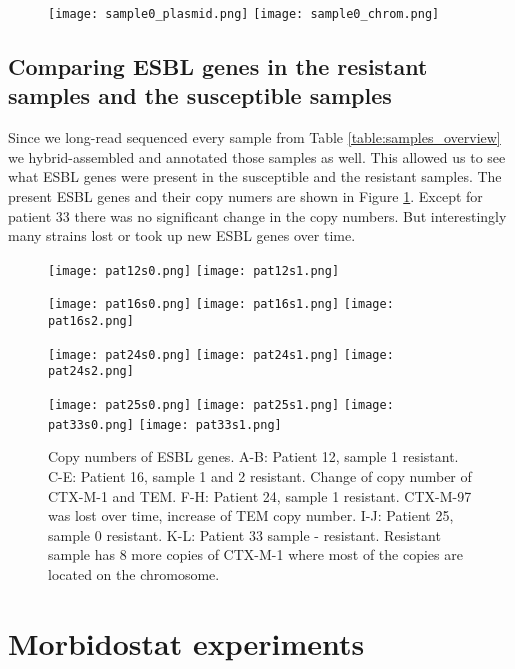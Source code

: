 \begin{figure}
	\texttt{[image: sample0\_plasmid.png]}
	\texttt{[image: sample0\_chrom.png]}
	\caption{}
\end{figure}
	
\subsection{Comparing ESBL genes in the resistant samples and the susceptible samples}
Since we long-read sequenced every sample from Table \ref{table:samples_overview} we hybrid-assembled and annotated those samples as well. This allowed us to see what ESBL genes were present in the susceptible and the resistant samples. The present ESBL genes and their copy numers are shown in Figure \ref{figure:esbl_genes}. Except for patient 33 there was no significant change in the copy numbers. But interestingly many strains lost or took up new ESBL genes over time. 
\begin{figure}[H]
	\texttt{[image: pat12s0.png]}
	\texttt{[image: pat12s1.png]}	
	
	\texttt{[image: pat16s0.png]}
	\texttt{[image: pat16s1.png]}
	\texttt{[image: pat16s2.png]}
	
	\texttt{[image: pat24s0.png]}
	\texttt{[image: pat24s1.png]}
	\texttt{[image: pat24s2.png]}
	
	\texttt{[image: pat25s0.png]}\hfill	
	\texttt{[image: pat25s1.png]}\hfill
	\texttt{[image: pat33s0.png]}\hfill
	\texttt{[image: pat33s1.png]}\hfill

	\caption{Copy numbers of ESBL genes. A-B: Patient 12, sample 1 resistant. C-E: Patient 16, sample 1 and 2 resistant. Change of copy number of CTX-M-1 and TEM. F-H: Patient 24, sample 1 resistant. CTX-M-97 was lost over time, increase of TEM copy number. I-J: Patient 25, sample 0 resistant. K-L: Patient 33 sample - resistant. Resistant sample has 8 more copies of CTX-M-1 where most of the copies are located on the chromosome.}
	\label{figure:esbl_genes}
\end{figure}

\section{Morbidostat experiments}

